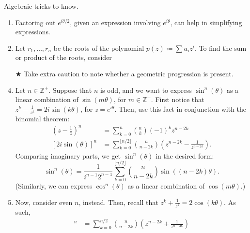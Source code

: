 \documentclass[oneside]{book}
\newcommand{\highlight}[2][red!50]{\mathpalette{\highlightwithstyle[#1]}{#2}}
\newcommand{\highlightwithstyle}[3][red!50]{
  \begingroup                         %
    \sbox0{$\mathsurround 0pt #2#3$}%
    \setlength{\fboxsep}{.5pt}        %
    \sbox2{\hspace{-.5pt}%
      \colorbox{#1}{\usebox0}%
    }%
    \dp2=\dp0 \ht2=\ht0 \wd2=\wd0     %
    \box2                             %
  \endgroup                           %
}
\begin{document}
\begin{note}
  Algebraic tricks to know.
  \begin{enumerate}
    \item Factoring out \(e^{i\theta/2}\), given an expression involving \(e^{i\theta}\), can help in simplifying expressions.
    \item Let \(r_1,\dots,r_n\) be the roots of the polynomial \(p(z)\coloneq\sum{a_iz^i}\). To find the sum or product of the roots, consider
    \item[\(\bigstar\)] Take extra caution to note whether a geometric progression is present.
    \item Let \(n\in \mathbb{Z}^{+}\). Suppose that \(n\) is odd, and we want to express \(\sin^n(\theta)\) as a linear combination of \(\sin(m\theta)\), for \(m\in \mathbb{Z}^{+}\). First notice that \(z^k-\frac{1}{z^k}=2i\sin(k\theta)\), for \(z=e^{i\theta}\). Then, use this fact in conjunction with the binomial theorem:
    \begin{align*}
      \left( z-\frac{1}{z} \right)^n &= \sum_{k=0}^{n}{\binom{n}{k}(-1)^kz^{n-2k}}\\
      [2i\sin(\theta)]^n &= \sum_{k=0}^{\lfloor n/2 \rfloor}{\binom{n}{n-2k}\left( z^{n-2k}-\frac{1}{z^{n-2k}} \right)}.
    \end{align*}
    Comparing imaginary parts, we get \(\sin^n(\theta)\) in the desired form:
    \[\sin^n(\theta)=\frac{1}{i^{n-1}2^{n-1}}
    \sum_{k=0}^{\lfloor n/2 \rfloor}{\binom{n}{n-2k}\sin((n-2k)\theta)}.\]
    (Similarly, we can express \(\cos^n(\theta)\) as a linear combination of \(\cos(m\theta)\).)
    \item Now, consider even \(n\), instead. Then, recall that \(z^k+\frac{1}{z^k}=2\cos(k\theta)\). As such,
    \begin{align*}
      [2i\sin(\theta)]^n &= \sum_{k=0}^{n/2}{\binom{n}{n-2k}\left( z^{n-2k}+\frac{1}{z^{n-2k}} \right)}\\

\end{align*}
\end{enumerate}
\end{note}
\end{document}
